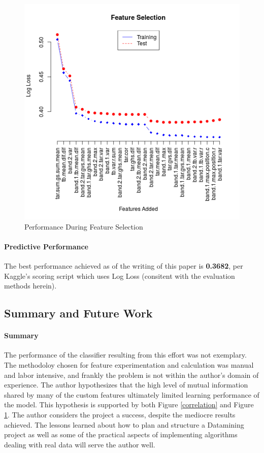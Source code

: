 \documentclass[fleqn,10pt]{SelfArx} %
\begin{document}
\begin{figure}
	\includegraphics[width=.9\linewidth]{iceberg/feat_sel.png}
	\caption{Performance During Feature Selection}\label{feat_selection}
\end{figure}

\paragraph{Predictive Performance}
The best performance achieved as of the writing of this paper is \textbf{0.3682}, per Kaggle's scoring script which uses Log Loss (consitent with the evaluation methods herein).

\subsection{Summary and Future Work}
\paragraph{Summary}
The performance of the classifier resulting from this effort was not exemplary.  The methodoloy chosen for feature experimentation and calculation was manual and labor intensive, and frankly the problem is not within the author's domain of experience.  The author hypothesizes that the high level of mutual information shared by many of the custom features ultimately limited learning performance of the model.  This hypothesis is supported by both Figure \ref{correlation} and Figure \ref{feat_selection}.  The author considers the project a success, despite the mediocre results achieved.  The lessons learned about how to plan and structure a Datamining project as well as some of the practical aspects of implementing algorithms dealing with real data will serve the author well.
\end{document}
